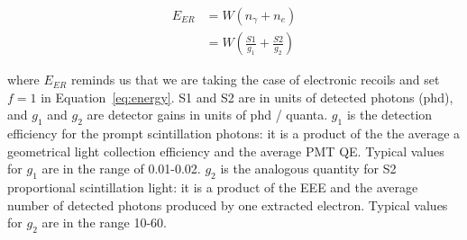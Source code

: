 \begin{equation}
\label{eq:energy}
\begin{split}
E_{ER} &= W (n_{\gamma} + n_{e} ) \\
   &= W (\frac{S1}{g_{1}} + \frac{S2}{g_{2}})
\end{split}
\end{equation}

where $E_{ER}$ reminds us that we are taking the case of electronic recoils and set $f=1$ in Equation~\ref{eq:energy}. S1 and S2 are in units of detected photons (phd), and $g_{1}$ and $g_{2}$ are detector gains in units of phd / quanta. $g_{1}$ is the detection efficiency for the prompt scintillation photons: it is a product of the the average a geometrical light collection efficiency and the average \ac{PMT} \ac{QE}. Typical values for $g_{1}$ are in the range of 0.01-0.02. $g_{2}$ is the analogous quantity for S2 proportional scintillation light: it is a product of the \ac{EEE} and the average number of detected photons produced by one extracted electron. Typical values for $g_{2}$ are in the range 10-60.



